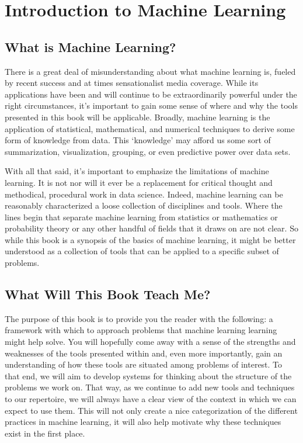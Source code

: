 \chapter{Introduction to Machine Learning}

\section{What is Machine Learning?}
There is a great deal of misunderstanding about what machine learning is, fueled by recent success and at times sensationalist media coverage. While its applications have been and will continue to be extraordinarily powerful under the right circumstances, it's important to gain some sense of where and why the tools presented in this book will be applicable. Broadly, machine learning is the application of statistical, mathematical, and numerical techniques to derive some form of knowledge from data. This `knowledge' may afford us some sort of summarization, visualization, grouping, or even predictive power over data sets.

With all that said, it's important to emphasize the limitations of machine learning. It is not nor will it ever be a replacement for critical thought and methodical, procedural work in data science. Indeed, machine learning can be reasonably characterized a loose collection of disciplines and tools. Where the lines begin that separate machine learning from statistics or mathematics or probability theory or any other handful of fields that it draws on are not clear. So while this book is a synopsis of the basics of machine learning, it might be better understood as a collection of tools that can be applied to a specific subset of problems.

\section{What Will This Book Teach Me?}
The purpose of this book is to provide you the reader with the following: a framework with which to approach problems that machine learning learning might help solve. You will hopefully come away with a sense of the strengths and weaknesses of the tools presented within and, even more importantly, gain an understanding of how these tools are situated among problems of interest. To that end, we will aim to develop systems for thinking about the structure of the problems we work on. That way, as we continue to add new tools and techniques to our repertoire, we will always have a clear view of the context in which we can expect to use them. This will not only create a nice categorization of the different practices in machine learning, it will also help motivate why these techniques exist in the first place.

